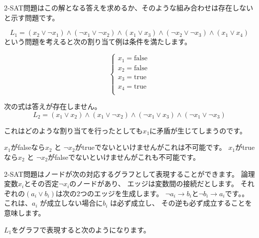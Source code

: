 2-SAT問題はこの解となる答えを求めるか、そのような組み合わせは存在しないと示す問題です。

\[
L_1 = (x_2 \lor \lnot x_1) \land
      (\lnot x_1 \lor \lnot x_2) \land
      (x_1 \lor x_3) \land
      (\lnot x_2 \lor \lnot x_3) \land
      (x_1 \lor x_4)
\]
という問題を考えると次の割り当て例は条件を満たします。

\[
\begin{cases}
x_1 = \textrm{false} \\
x_2 = \textrm{false} \\
x_3 = \textrm{true} \\
x_4 = \textrm{true} \\
\end{cases}
\]

次の式は答えが存在しません。
\[
L_2 = (x_1 \lor x_2) \land
      (x_1 \lor \lnot x_2) \land
      (\lnot x_1 \lor x_3) \land
      (\lnot x_1 \lor \lnot x_3)
\]

これはどのような割り当てを行ったとしても$x_1$に矛盾が生じてしまうのです。

$x_1$がfalseなら$x_2$ と $\lnot x_2$がtrueでないといけませんがこれは不可能です。
$x_1$がtrueなら$x_2$ と $\lnot x_2$がfalseでないといけませんがこれも不可能です。

2-SAT問題はノードが次の対応するグラフとして表現することができます。
論理変数$x_i$とその否定$\lnot x_i$のノードがあり、
エッジは変数間の接続だとします。
それぞれの$(a_i \lor b_i)$は次の2つのエッジを生成します。
$\lnot a_i \to b_i$と$\lnot b_i \to a_i$です。。
これは、$a_i$ が成立しない場合に$b_i$ は必ず成立し、
その逆も必ず成立することを意味します。

$L_1$をグラフで表現すると次のようになります。

